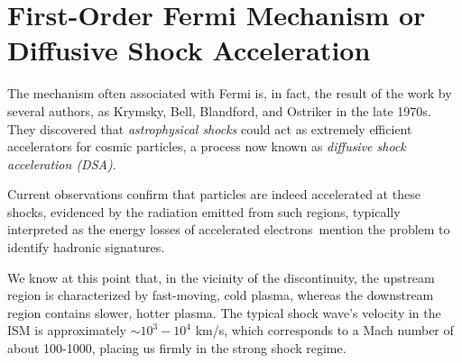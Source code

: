 \section{First-Order Fermi Mechanism or Diffusive Shock Acceleration}

The mechanism often associated with Fermi is, in fact, the result of the work by several authors, as Krymsky, Bell, Blandford, and Ostriker in the late 1970s. 
%
%
They discovered that \emph{astrophysical shocks} could act as extremely efficient accelerators for cosmic particles, a process now known as \emph{diffusive shock acceleration (DSA)}.

Current observations confirm that particles are indeed accelerated at these shocks, evidenced by the radiation emitted from such regions, typically interpreted as the energy losses of accelerated electrons~{\color{red}mention the problem to identify hadronic signatures}.

We know at this point that, in the vicinity of the discontinuity, the upstream region is characterized by fast-moving, cold plasma, whereas the downstream region contains slower, hotter plasma. 
%
The typical shock wave's velocity in the ISM is approximately \( \sim 10^3-10^4 \) km/s, which corresponds to a Mach number of about 100-1000, placing us firmly in the strong shock regime.

